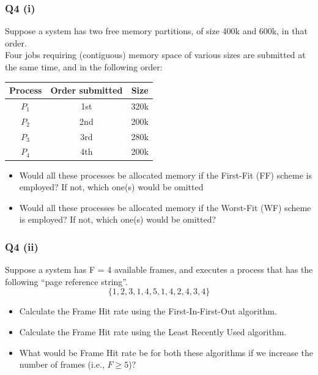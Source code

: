 \documentclass[a4paper, 10pt]{article}
\begin{document}
\subsubsection*{Q4 (i)}
Suppose a system has two free memory partitions, of size 400k and
600k, in that order. \\[2ex]
Four jobs requiring (contiguous) memory space of various sizes are
submitted at the same time, and in the following order:
\begin{center}
    \begin{tabular}{c|c|c}
        Process & Order submitted & Size \\
        \hline
        $P_1$   & 1st             & 320k \\
        $P_2$   & 2nd             & 200k \\
        $P_3$   & 3rd             & 280k \\
        $P_4$   & 4th             & 200k \\
    \end{tabular}
\end{center}
\begin{itemize}
    \item Would all these processes be allocated memory if the First-Fit (FF)
          scheme is employed? If not, which one(s) would be omitted
    \item Would all these processes be allocated memory if the Worst-Fit
          (WF) scheme is employed? If not, which one(s) would be omitted?
\end{itemize}
\subsubsection*{Q4 (ii)}
Suppose a system has F = 4 available frames, and executes a process that has the following “page reference string”.
$$\{1, 2, 3, 1, 4, 5, 1, 4, 2, 4, 3, 4\}$$
\begin{itemize}
    \item Calculate the Frame Hit rate using the First-In-First-Out algorithm.
    \item Calculate the Frame Hit rate using the Least Recently Used
          algorithm.
    \item What would be Frame Hit rate be for both these algorithms if we
          increase the number of frames (i.e., $F \geq 5$)?
\end{itemize}
\end{document}
